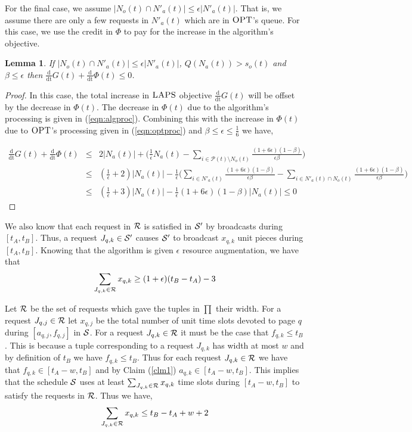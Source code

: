 \documentclass[11pt]{article}
\newtheorem{lemma}{Lemma}[section]
\newcommand{\opt}{\textrm{\sc OPT}}
\newcommand{\eps}{\epsilon}
\newcommand{\laps}{\textrm{\sc LAPS}}
\newcommand{\ddphi}{\frac{\mathrm{d}}{\mathrm{dt}} \Phi}
\newcommand{\ddg}{\frac{\mathrm{d}}{\mathrm{dt}} G}
\newcommand{\cR}{{\cal R}}
\newcommand{\cS}{{\cal S}}
\newcommand{\parr}{\mathcal{P}}
\begin{document}
For the final case, we assume $|N_o(t) \cap N'_a(t)| \leq \eps|N'_a(t)|$.  That is, we assume there are only a few requests in $N'_a(t)$ which are in $\opt$'s queue.  For this case, we use the credit in $\Phi$ to pay for the increase in the algorithm's objective.

\begin{lemma}
\label{lem:phi}
If $| N_o(t) \cap N'_a(t)| \leq \eps|N'_a(t)|$, $Q(N_a(t)) >  s_o(t)$ and $\beta \leq \eps$ then $\ddg(t) + \ddphi(t) \leq 0$.
\end{lemma}
\begin{proof}
In this case, the total increase in $\laps$ objective $\ddg(t)$ will be offset by the decrease in $\Phi(t)$.  The decrease in $\Phi(t)$ due to the algorithm's processing is given in (\ref{eqn:algproc}). Combining this with the increase in $\Phi(t)$ due to $\opt$'s processing given in (\ref{eqn:optproc}) and $\beta \leq \eps \leq \frac{1}{6}$ we have,

\begin{eqnarray*}
\ddg(t) + \ddphi(t) &\leq& 2|N_a(t)| + \Big(\frac{1}{\eps}N_a(t) -\sum_{i \in \parr(t) \setminus N_o(t) } \frac{(1+6\eps)(1-\beta)}{ \eps\beta}  \Big) \\
&\leq& (\frac{1}{\eps} + 2) |N_a(t)| - \frac{1}{\eps}\Big (\sum_{i \in N'_a(t) } \frac{(1+6\eps)(1-\beta)}{\eps \beta} - \sum_{i \in N'_a(t) \cap N_o(t)  } \frac{(1+6\eps)(1-\beta)}{\eps\beta} \Big) \\
&\leq &  (\frac{1}{\eps} + 3) |N_a(t)| - \frac{1}{\eps}(1+6\eps)(1-\beta)|N_a(t)| \leq 0
\end{eqnarray*}
\end{proof} 



We also know that each request in $\cR$ is satisfied in $\cS'$ by broadcasts during $[t_A,t_B]$.   Thus, a request $J_{q,k} \in \cS'$ causes $\cS'$ to broadcast  $x_{q,k}$ unit pieces during $[t_A,t_B]$.  Knowing that the algorithm is given $\eps$ resource augmentation, we have that $$ \sum_{J_{q,k} \in \cR} x_{q,k}  \geq (1+\eps)(t_B -t_A) -3$$

 Let $\cR$ be the set of requests which gave the tuples in $\prod$ their width.  For a request $J_{q,j} \in \cR$ let $x_{q,j}$ be the total number of unit time slots devoted to page $q$ during $[a_{q,j}, f_{q,j}]$ in $\cS$.    For a request $J_{q,k} \in \cR$ it must be the case that $f_{q,k} \leq t_B$.  This is because a tuple corresponding to a request $J_{q,k}$ has width at most $w$ and by definition of $t_B$ we have $f_{q,k} \leq t_B$.  Thus for each request $J_{q,k} \in \cR$ we have that $f_{q,k} \in [t_A - w, t_B]$ and by Claim (\ref{clm1}) $a_{q,k} \in  [t_A - w, t_B]$.  This implies that the schedule $\cS$ uses at least $\sum_{J_{q,k} \in \cR} x_{q,k} $ time slots during $[t_A - w, t_B]$ to satisfy the requests in $\cR$. Thus we have,  $$\sum_{J_{q,k} \in \cR} x_{q,k} \leq t_B - t_A + w+2$$
\end{document}

